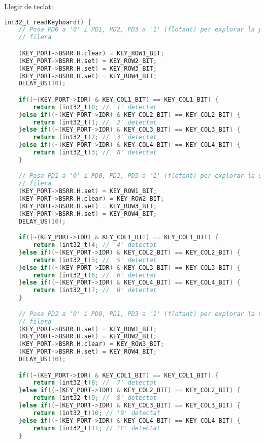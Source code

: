 \documentclass{report}
\begin{document}
    Llegir de teclat:\\
    \begin{lstlisting}[language=C]
int32_t readKeyboard() {
    // Posa PD0 a '0' i PD1, PD2, PD3 a '1' (flotant) per explorar la primera
    // filera

    (KEY_PORT->BSRR.H.clear) = KEY_ROW1_BIT;
    (KEY_PORT->BSRR.H.set) = KEY_ROW2_BIT;
    (KEY_PORT->BSRR.H.set) = KEY_ROW3_BIT;
    (KEY_PORT->BSRR.H.set) = KEY_ROW4_BIT;
    DELAY_US(10);

    if((~(KEY_PORT->IDR) & KEY_COL1_BIT) == KEY_COL1_BIT) {
        return (int32_t)0; // '1' detectat
    }else if((~(KEY_PORT->IDR) & KEY_COL2_BIT) == KEY_COL2_BIT) {
        return (int32_t)1; // '2' detectat
    }else if((~(KEY_PORT->IDR) & KEY_COL3_BIT) == KEY_COL3_BIT) {
        return (int32_t)2; // '3' detectat
    }else if((~(KEY_PORT->IDR) & KEY_COL4_BIT) == KEY_COL4_BIT) {
        return (int32_t)3; // 'A' detectat
    }

    // Posa PD1 a '0' i PD0, PD2, PD3 a '1' (flotant) per explorar la segona
    // filera
    (KEY_PORT->BSRR.H.set) = KEY_ROW1_BIT;
    (KEY_PORT->BSRR.H.clear) = KEY_ROW2_BIT;
    (KEY_PORT->BSRR.H.set) = KEY_ROW3_BIT;
    (KEY_PORT->BSRR.H.set) = KEY_ROW4_BIT;
    DELAY_US(10);

    if((~(KEY_PORT->IDR) & KEY_COL1_BIT) == KEY_COL1_BIT) {
        return (int32_t)4; // '4' detectat
    }else if((~(KEY_PORT->IDR) & KEY_COL2_BIT) == KEY_COL2_BIT) {
        return (int32_t)5; // '5' detectat
    }else if((~(KEY_PORT->IDR) & KEY_COL3_BIT) == KEY_COL3_BIT) {
        return (int32_t)6; // '6' detectat
    }else if((~(KEY_PORT->IDR) & KEY_COL4_BIT) == KEY_COL4_BIT) {
        return (int32_t)7; // 'B' detectat
    }

    // Posa PD2 a '0' i PD0, PD1, PD3 a '1' (flotant) per explorar la tercera
    // filera
    (KEY_PORT->BSRR.H.set) = KEY_ROW1_BIT;
    (KEY_PORT->BSRR.H.set) = KEY_ROW2_BIT;
    (KEY_PORT->BSRR.H.clear) = KEY_ROW3_BIT;
    (KEY_PORT->BSRR.H.set) = KEY_ROW4_BIT;
    DELAY_US(10);

    if((~(KEY_PORT->IDR) & KEY_COL1_BIT) == KEY_COL1_BIT) {
        return (int32_t)8; // '7' detectat
    }else if((~(KEY_PORT->IDR) & KEY_COL2_BIT) == KEY_COL2_BIT) {
        return (int32_t)9; // '8' detectat
    }else if((~(KEY_PORT->IDR) & KEY_COL3_BIT) == KEY_COL3_BIT) {
        return (int32_t)10; // '9' detectat
    }else if((~(KEY_PORT->IDR) & KEY_COL4_BIT) == KEY_COL4_BIT) {
        return (int32_t)11; // 'C' detectat
    }


\end{lstlisting}
\end{document}

